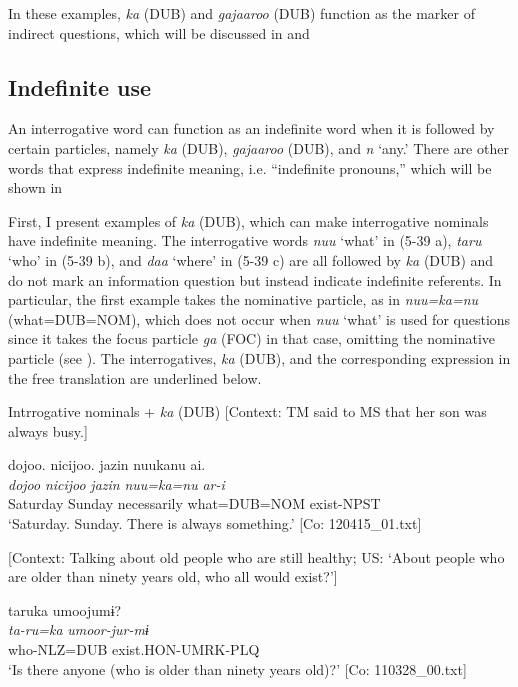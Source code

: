 In these examples, \textit{ka} (DUB) and \textit{gajaaroo} (DUB) function as the marker of indirect questions, which will be discussed in  and 

\subsection{Indefinite use}

An interrogative word can function as an indefinite word when it is followed by certain particles, namely \textit{ka} (DUB), \textit{gajaaroo} (DUB), and \textit{n} ‘any.’ There are other words that express indefinite meaning, i.e. “indefinite pronouns,” which will be shown in 

  First, I present examples of \textit{ka} (DUB), which can make interrogative nominals have indefinite meaning. The interrogative words \textit{nuu} ‘what’ in (5-39 a), \textit{taru} ‘who’ in (5-39 b), and \textit{daa} ‘where’ in (5-39 c) are all followed by \textit{ka} (DUB) and do not mark an information question but instead indicate indefinite referents. In particular, the first example takes the nominative particle, as in \textit{nuu=ka=nu} (what=DUB=NOM), which does not occur when \textit{nuu} ‘what’ is used for questions since it takes the focus particle \textit{ga} (FOC) in that case, omitting the nominative particle (see ). The interrogatives, \textit{ka} (DUB), and the corresponding expression in the free translation are underlined below.

\ea \label{ex:5:39}   Intrrogative nominals + \textit{ka} (DUB)
 \ea \label{ex:5:39a} [Context: TM said to MS that her son was always busy.]

\glll  {\textbar}dojoo{\textbar}.  {\textbar}nicijoo{\textbar}.  jazin  nuukanu  ai.\\
\textit{dojoo}  \textit{nicijoo}  \textit{jazin}  \textit{nuu=ka=nu}  \textit{ar-i}\\
Saturday  Sunday  necessarily  what=DUB=NOM  exist-NPST\\
\glt ‘Saturday. Sunday. There is always something.’ [Co: 120415\_01.txt]

 \ex \label{ex:5:39b} [Context: Talking about old people who are still healthy; US: ‘About people who are older than ninety years old, who all would exist?’]

\glll  taruka  umoojumɨ?\\
\textit{ta-ru=ka}  \textit{umoor-jur-mɨ}\\
who-NLZ=DUB  exist.HON-UMRK-PLQ\\
\glt ‘Is there anyone (who is older than ninety years old)?’ [Co: 110328\_00.txt]

